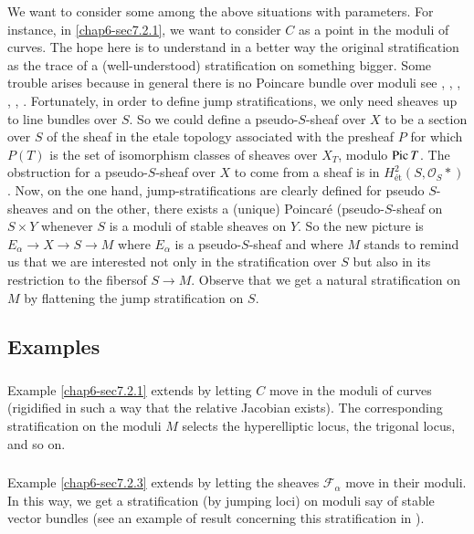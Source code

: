 We want to consider some among the above situations with
parameters. For instance, in \ref{chap6-sec7.2.1}, we want to consider
$C$ as a point in the moduli of curves. The hope here is to understand
in a better way the original stratification as the trace of a
(well-understood) stratification on something bigger. Some trouble
arises because in general there is no Poincare bundle over moduli
see \cite{chap6-NR1}, \cite{chap6-R}, \cite{chap6-LP1}, \cite{chap6-HN}, \cite{chap6-Me}, \cite{chap6-MR}. Fortunately,
in order to define jump stratifications, we only need sheaves up to
line bundles over $S$. So we could define a pseudo-$S$-sheaf over $X$
to be a section over $S$ of the sheaf in the etale topology associated
with the presheaf $P$ for which $P(T)$ is the set of isomorphism
classes of sheaves over $X_{T}$, modulo $\operatorname{Pic} T$. The obstruction for
a pseudo-$S$-sheaf over $X$ to come from a sheaf is in
$H^{2}_{\text{\'et}}(S,\mathscr{O}_{S}\ast)$. Now, on the one hand,
jump-stratifications are clearly defined for pseudo $S$-sheaves and on
the other, there exists a (unique) Poincar\'e (pseudo-$S$-sheaf on
$S\times Y$ whenever $S$ is a moduli of stable sheaves on $Y$. So the
new picture is $E_{\alpha}\to X\to S\to M$ where $E_{\alpha}$ is a
pseudo-$S$-sheaf and where $M$ stands to remind us that we are
interested not only in the stratification over $S$ but also in its
restriction to the fibers\pageoriginale of $S\to M$. Observe that we
get a natural stratification on $M$ by flattening the jump
stratification on $S$.

\subsection{Examples}\label{chap6-sec7.4}

\subsubsection{}\label{chap6-sec7.4.1}
Example \ref{chap6-sec7.2.1} extends by letting $C$ move in the moduli
of curves (rigidified in such a way that the relative Jacobian
exists). The corresponding stratification on the moduli $M$ selects
the hyperelliptic locus, the trigonal locus, and so on.

\subsubsection{}\label{chap6-sec7.4.2}
Example \ref{chap6-sec7.2.3} extends by letting the sheaves
$\mathscr{F}_{\alpha}$ move in their moduli. In this way, we get a
stratification (by jumping loci) on moduli say of stable vector
bundles (see an example of result concerning this stratification
in \cite[Prop. 5.2]{chap6-LP2}).

